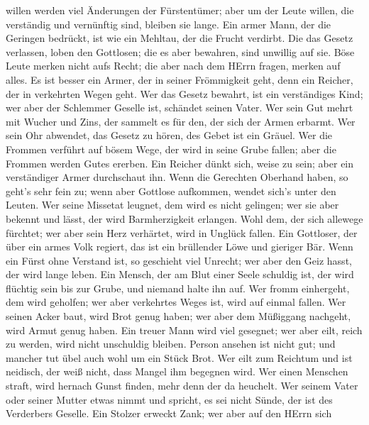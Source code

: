 willen werden viel Änderungen der Fürstentümer; aber um der Leute
willen, die verständig und vernünftig sind, bleiben sie lange.
 Ein armer Mann, der die Geringen bedrückt, ist wie ein
Mehltau, der die Frucht verdirbt.  Die das Gesetz verlassen,
loben den Gottlosen; die es aber bewahren, sind unwillig auf sie.
 Böse Leute merken nicht aufs Recht; die aber nach dem HErrn
fragen, merken auf alles.  Es ist besser ein Armer, der in
seiner Frömmigkeit geht, denn ein Reicher, der in verkehrten Wegen geht.
 Wer das Gesetz bewahrt, ist ein verständiges Kind; wer aber
der Schlemmer Geselle ist, schändet seinen Vater.  Wer sein
Gut mehrt mit Wucher und Zins, der sammelt es für den, der sich der
Armen erbarmt.  Wer sein Ohr abwendet, das Gesetz zu hören,
des Gebet ist ein Gräuel.  Wer die Frommen verführt auf
bösem Wege, der wird in seine Grube fallen; aber die Frommen werden
Gutes ererben.  Ein Reicher dünkt sich, weise zu sein; aber
ein verständiger Armer durchschaut ihn.  Wenn die Gerechten
Oberhand haben, so geht's sehr fein zu; wenn aber Gottlose aufkommen,
wendet sich's unter den Leuten.  Wer seine Missetat
leugnet, dem wird es nicht gelingen; wer sie aber bekennt und lässt, der
wird Barmherzigkeit erlangen.  Wohl dem, der sich allewege
fürchtet; wer aber sein Herz verhärtet, wird in Unglück fallen.
 Ein Gottloser, der über ein armes Volk regiert, das ist
ein brüllender Löwe und gieriger Bär.  Wenn ein Fürst ohne
Verstand ist, so geschieht viel Unrecht; wer aber den Geiz hasst, der
wird lange leben.  Ein Mensch, der am Blut einer Seele
schuldig ist, der wird flüchtig sein bis zur Grube, und niemand halte
ihn auf.  Wer fromm einhergeht, dem wird geholfen; wer aber
verkehrtes Weges ist, wird auf einmal fallen.  Wer seinen
Acker baut, wird Brot genug haben; wer aber dem Müßiggang nachgeht, wird
Armut genug haben.  Ein treuer Mann wird viel gesegnet; wer
aber eilt, reich zu werden, wird nicht unschuldig bleiben. 
Person ansehen ist nicht gut; und mancher tut übel auch wohl um ein
Stück Brot.  Wer eilt zum Reichtum und ist neidisch, der
weiß nicht, dass Mangel ihm begegnen wird.  Wer einen
Menschen straft, wird hernach Gunst finden, mehr denn der da heuchelt.
 Wer seinem Vater oder seiner Mutter etwas nimmt und
spricht, es sei nicht Sünde, der ist des Verderbers Geselle.
 Ein Stolzer erweckt Zank; wer aber auf den HErrn sich
